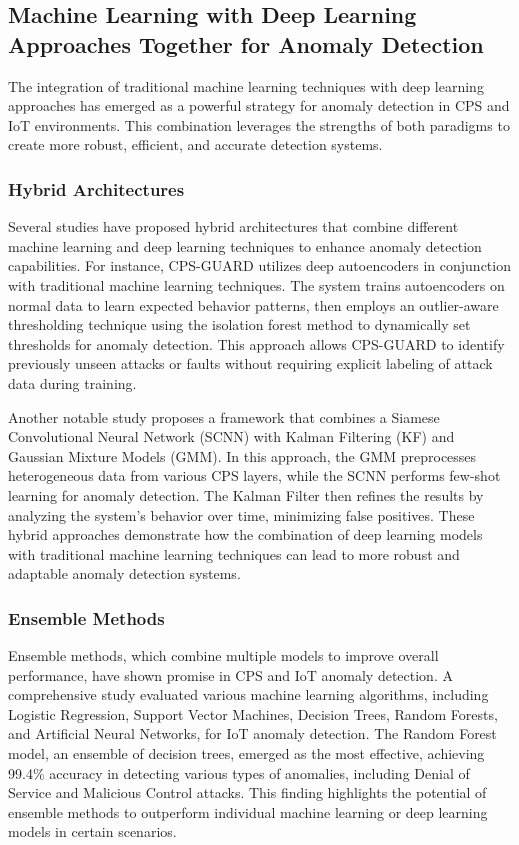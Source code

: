 \subsection{Machine Learning with Deep Learning Approaches Together for Anomaly Detection}

The integration of traditional machine learning techniques with deep learning approaches has emerged as a powerful strategy for anomaly detection in CPS and IoT environments. This combination leverages the strengths of both paradigms to create more robust, efficient, and accurate detection systems.

\subsubsection{Hybrid Architectures}

Several studies have proposed hybrid architectures that combine different machine learning and deep learning techniques to enhance anomaly detection capabilities. For instance, CPS-GUARD \cite{86} utilizes deep autoencoders in conjunction with traditional machine learning techniques. The system trains autoencoders on normal data to learn expected behavior patterns, then employs an outlier-aware thresholding technique using the isolation forest method to dynamically set thresholds for anomaly detection. This approach allows CPS-GUARD to identify previously unseen attacks or faults without requiring explicit labeling of attack data during training.

Another notable study \cite{71} proposes a framework that combines a Siamese Convolutional Neural Network (SCNN) with Kalman Filtering (KF) and Gaussian Mixture Models (GMM). In this approach, the GMM preprocesses heterogeneous data from various CPS layers, while the SCNN performs few-shot learning for anomaly detection. The Kalman Filter then refines the results by analyzing the system's behavior over time, minimizing false positives. These hybrid approaches demonstrate how the combination of deep learning models with traditional machine learning techniques can lead to more robust and adaptable anomaly detection systems.

\subsubsection{Ensemble Methods}

Ensemble methods, which combine multiple models to improve overall performance, have shown promise in CPS and IoT anomaly detection. A comprehensive study \cite{76} evaluated various machine learning algorithms, including Logistic Regression, Support Vector Machines, Decision Trees, Random Forests, and Artificial Neural Networks, for IoT anomaly detection. The Random Forest model, an ensemble of decision trees, emerged as the most effective, achieving 99.4\% accuracy in detecting various types of anomalies, including Denial of Service and Malicious Control attacks. This finding highlights the potential of ensemble methods to outperform individual machine learning or deep learning models in certain scenarios.

